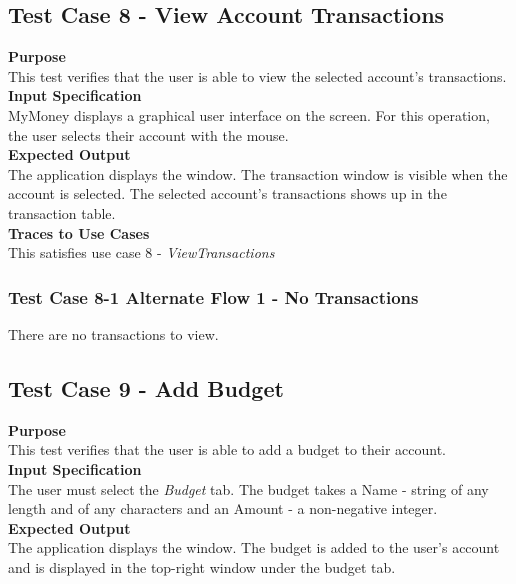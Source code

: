 \documentclass[12pt]{article}
\begin{document}
\clearpage 
\subsection{Test Case 8 - View Account Transactions} \label{TC-8}
\noindent
{\bf Purpose}\\
This test verifies that the user is able to view the selected account's transactions.\\
                                                    
\noindent
{\bf Input Specification}\\
MyMoney displays a graphical user interface on the screen.
For this operation, the user selects their account with the mouse.\\

\noindent
{\bf Expected Output}\\
The application displays the window.       
The transaction window is visible when the account is selected.
The selected account's transactions shows up in the transaction table. \\

\noindent
{\bf Traces to Use Cases}\\
This satisfies use case 8 - \textit{ViewTransactions} 

\subsubsection
{Test Case 8-1 Alternate Flow 1 - No Transactions}
There are no transactions to view. 

\clearpage 

\subsection{Test Case 9 - Add Budget} \label{TC-9}
\noindent
{\bf Purpose}\\
This test verifies that the user is able to add a budget to their account.\\

{\bf Input Specification}\\
The user must select the \textit{Budget} tab. The budget takes a Name - string of any length and of any characters
and an Amount - a non-negative integer.\\

{\bf Expected Output}\\
The application displays the window.
The budget is added to the user's account and is displayed in the top-right window
under the budget tab.\\
\end{document}

